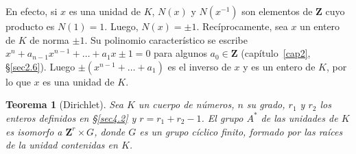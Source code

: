 \documentclass[bibtotoc,leqno,spanish]{amsbook}
\newcommand{\ZZ}{\mathbf{Z}}
\numberwithin{equation}{section}
\theoremstyle{note}
\theoremstyle{note}
\newtheorem{theorem}{Teorema}
\theoremstyle{rem}
\numberwithin{theorem}{section}
\numberwithin{proposition}{section}
\numberwithin{definition}{section}
\numberwithin{lemma}{section}
\numberwithin{corollary}{section}
\numberwithin{example}{section}
\numberwithin{footnote}{section}%
\begin{document}
En efecto, si $x$ es una unidad de $K$, $N(x)$ y $N(x^{-1})$ son elementos de $\ZZ$ cuyo producto es
$N(1) = 1$. Luego, $N(x) = \pm 1$. Rec\'iprocamente, sea $x$ un entero de $K$ de norma $\pm 1$. Su
polinomio caracter\'istico se escribe $x^{n}+a_{n-1}x^{n-1}+\dots+a_{1}x\pm 1= 0$ para algunos
$a_{0}\in\ZZ$ (cap\'itulo~\ref{cap2}, \S\ref{sec2.6}). Luego $\pm(x^{n-1}+\dots+a_{1})$ es el inverso de $x$ y es un entero de
$K$, por lo que $x$ es una unidad de $K$.

\begin{theorem}[Dirichlet]\label{teo4.4.1}
Sea $K$ un cuerpo de n\'umeros, $n$ su grado, $r_{1}$ y $r_{2}$ los enteros definidos en \S\ref{sec4.2}
y $r = r_{1}+r_{2}-1$. El grupo $A^{*}$ de las unidades de $K$ es isomorfo a $\ZZ^{r}\times G$, donde
$G$ es un grupo c\'iclico finito, formado por las ra\'ices de la unidad contenidas en $K$.
\end{theorem}
\end{document}
